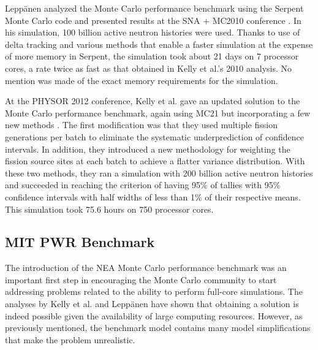 Leppänen analyzed the Monte Carlo performance benchmark using the Serpent Monte
Carlo code \cite{vtt-leppanen-2007} and presented results at the SNA + MC2010
conference \cite{sna-leppanen-2010}. In his simulation, 100 billion active
neutron histories were used. Thanks to use of delta tracking and various methods
that enable a faster simulation at the expense of more memory in Serpent, the
simulation took about 21 days on 7 processor cores, a rate twice as fast as that
obtained in Kelly et al.'s 2010 analysis. No mention was made of the exact
memory requirements for the simulation.

At the PHYSOR 2012 conference, Kelly et al. gave an updated solution to the
Monte Carlo performance benchmark, again using MC21 but incorporating a few new
methods \cite{physor-kelly-2012}. The first modification was that they used
multiple fission generations per batch to eliminate the systematic
underprediction of confidence intervals. In addition, they introduced a new
methodology for weighting the fission source sites at each batch to achieve a
flatter variance distribution. With these two methods, they ran a simulation
with 200 billion active neutron histories and succeeded in reaching the
criterion of having 95\% of tallies with 95\% confidence intervals with half
widths of less than 1\% of their respective means. This simulation took 75.6
hours on 750 processor cores.

\subsection{MIT PWR Benchmark}

The introduction of the NEA Monte Carlo performance benchmark was an important
first step in encouraging the Monte Carlo community to start addressing problems
related to the ability to perform full-core simulations. The analyses by Kelly
et al. and Leppänen have shown that obtaining a solution is indeed possible
given the availability of large computing resources. However, as previously
mentioned, the benchmark model contains many model simplifications that make the
problem unrealistic.

